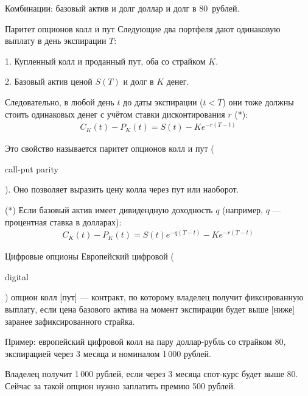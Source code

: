\documentclass{beamer}
\newcommand{\en}[1]{\begin{otherlanguage}{english}#1\end{otherlanguage}}
\newcommand{\usdrubstrike}{80}
\newcommand{\usdrubaxisspread}{8}
\begin{document}
\begin{frame}{Комбинации: базовый актив и долг}
 доллар и долг в \usdrubstrike\ рублей.

\justifying
\centering
\end{frame}



\begin{frame}{Паритет опционов колл и пут}
\justify
Следующие два портфеля дают одинаковую выплату в день экспирации $T$:

1. Купленный колл и проданный пут, оба со страйком $K$.

2. Базовый актив ценой $S(T)$ и долг в $K$ денег.

\justify
Следовательно, в любой день $t$ до даты экспирации ($t<T$) они тоже должны стоить одинаковых денег с учётом ставки дисконтирования $r$ (*):
\begin{align*}
C_K(t) - P_K(t) = S(t) - Ke^{-r(T-t)}
\end{align*}

\justify
Это свойство называется \alert{паритет опционов колл и пут} (\en{call-put parity}). Оно позволяет выразить цену колла через пут или наоборот.

\justify
(*) Если базовый актив имеет дивидендную доходность $q$ (например, $q$ --- процентная ставка в долларах):
\begin{align*}
C_K(t) - P_K(t) = S(t)e^{-q(T-t)} - Ke^{-r(T-t)}
\end{align*}
\end{frame}



\begin{frame}{Цифровые опционы}
\justify
Европейский \alert{цифровой} (\en{digital}) опцион колл [пут] --- контракт, по которому 
владелец получит фиксированную выплату, если цена базового актива на момент экспирации 
будет выше [ниже] заранее зафиксированного страйка.

\justify
Пример: европейский цифровой колл на пару доллар-рубль со страйком \usdrubstrike, экспирацией 
через 3 месяца и номиналом 1\,000 рублей.

\justify
Владелец получит 1\,000 рублей, если через 3 
месяца спот-курс будет выше \usdrubstrike. Сейчас за такой опцион нужно заплатить премию 500 
рублей.
\end{frame}
\end{document}
